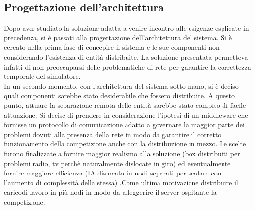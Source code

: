 \subsection{Progettazione dell'architettura}
Dopo aver studiato la soluzione adatta a venire incontro alle esigenze esplicate in precedenza, si è passati alla progettazione dell’architettura del sistema. Si è cercato nella prima fase di concepire il sistema e le sue componenti non considerando l’esistenza di entità distribuite. La soluzione presentata permetteva infatti di non preoccuparsi delle problematiche di rete per garantire la correttezza temporale del simulatore.\\
In un secondo momento, con l’architettura del sistema sotto mano, si è deciso quali componenti sarebbe stato desiderabile che fossero distribuite. A questo punto, attuare la separazione remota delle entità sarebbe stato compito di facile attuazione. Si decise di prendere in considerazione l’ipotesi di un middleware che fornisse un protocollo di comunicazione adatto a governare la maggior parte dei problemi dovuti alla presenza della rete in modo da garantire il corretto funzionamento della competizione anche con la distribuzione in mezzo.
Le scelte furono finalizzate a fornire maggior realismo alla soluzione (box distribuiti per problemi radio, tv perchè naturalmente dislocate in giro) ed eventualmente fornire maggiore efficienza (IA dislocata in nodi separati per scalare con l'aumento di complessità della stessa) .Come ultima motivazione distribuire il caricodi lavoro in più nodi in modo da alleggerire il server ospitante la competizione.
